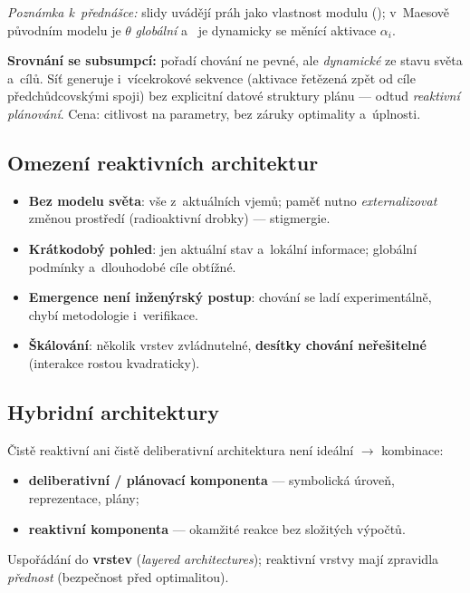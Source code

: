 \documentclass[11pt,a4paper]{article}
\theoremstyle{definition}
\begin{document}
\emph{Poznámka k~přednášce:} slidy uvádějí práh jako vlastnost modulu ();
v~Maesově původním modelu je $\theta$ \emph{globální} a~ je dynamicky se měnící
aktivace $\alpha_i$.

\medskip\noindent
\textbf{Srovnání se subsumpcí:} pořadí chování ne pevné, ale \emph{dynamické} ze stavu světa
a~cílů. Síť generuje i~vícekrokové  sekvence (aktivace řetězená zpět od cíle
předchůdcovskými spoji) bez explicitní datové struktury plánu --- odtud \emph{reaktivní
plánování}. Cena: citlivost na parametry, bez záruky optimality a~úplnosti.

\subsection{Omezení reaktivních architektur}

\begin{itemize}
\item \textbf{Bez modelu světa}: vše z~aktuálních vjemů; paměť nutno \emph{externalizovat}
  změnou prostředí (radioaktivní drobky) --- stigmergie.
\item \textbf{Krátkodobý pohled}: jen aktuální stav a~lokální informace; globální podmínky
  a~dlouhodobé cíle obtížné.
\item \textbf{Emergence není inženýrský postup}: chování se ladí experimentálně, chybí
  metodologie i~verifikace.
\item \textbf{Škálování}: několik vrstev zvládnutelné, \textbf{desítky chování neřešitelné}
  (interakce rostou kvadraticky).
\end{itemize}

\subsection{Hybridní architektury}
\label{ssec:hybridni}

Čistě reaktivní ani čistě deliberativní architektura není ideální $\to$ kombinace:
\begin{itemize}
\item \textbf{deliberativní / plánovací komponenta} --- symbolická úroveň, reprezentace, plány;
\item \textbf{reaktivní komponenta} --- okamžité reakce bez složitých výpočtů.
\end{itemize}
Uspořádání do \textbf{vrstev} (\emph{layered architectures}); reaktivní vrstvy mají zpravidla
\emph{přednost} (bezpečnost před optimalitou).
\end{document}
